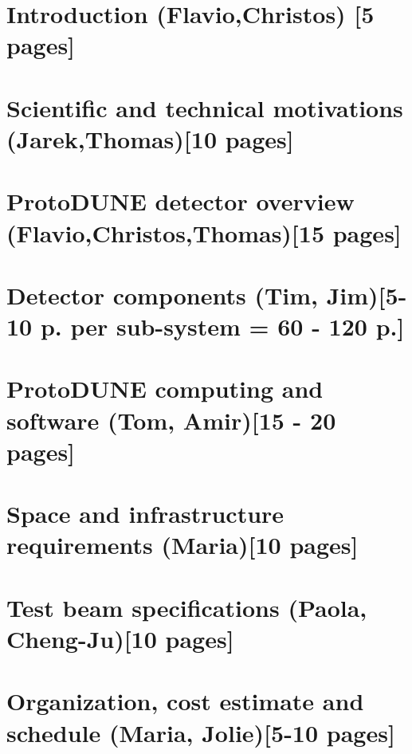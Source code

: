 \ifdefined\isfinal\documentclass[final]{pd-tdr}\else\documentclass{pd-tdr}\fi
\begin{document}






\chapter{Introduction {\color{red} (Flavio,Christos) [5 pages]}}


\chapter{Scientific and technical motivations {\color{red} (Jarek,Thomas)[10 pages]}}


\chapter{ProtoDUNE detector overview {\color{red} (Flavio,Christos,Thomas)[15 pages]}}


\chapter{Detector components {\color{red} (Tim, Jim)[5-10 p. per sub-system = 60 - 120 p.]}}


\chapter{ProtoDUNE computing and software {\color{red} (Tom, Amir)[15 - 20 pages]}}


\chapter{Space and infrastructure requirements {\color{red} (Maria)[10 pages]}}


\chapter{Test beam specifications {\color{red} (Paola, Cheng-Ju)[10 pages]}} 


\chapter{Organization, cost estimate and schedule {\color{red}  (Maria, Jolie)[5-10 pages]}}








%


% 

\cleardoublepage


\end{document}
